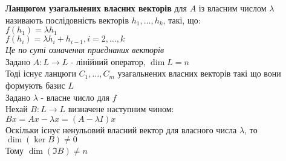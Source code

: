 \documentclass[a4paper, 10pt]{article}
\theoremstyle{theoremdd}
\begin{document}
\textbf{Ланцюгом узагальнених власних векторів} для $A$ із власним числом $\lambda$ називають послідовність векторів $h_1, \dots, h_k$, такі, що:\\
$f(h_1) = \lambda h_1$\\
$f(h_i) = \lambda h_i + h_{i-1}, i=2,\dots,k$\\
\textit{Це по суті означення приєднаних векторів}
\bigskip \\
\lm{} Задано $A: L \to L$ - лінійний оператор, $\dim L = n$\\
Тоді існує ланцюги $C_1,\dots,C_m$ узагальнених власних векторів такі що вони формують базис $L$\\
\proofMI
Задано $\lambda$ - власне число для $f$\\
Нехай $B: L \to L$ визначене наступним чином:\\
$Bx = Ax - \lambda x = (A - \lambda I)x$\\
Оскільки існує ненульовий власний вектор для власного числа $\lambda$, то $\dim (\ker B) \neq 0$\\
Тому $\dim (\Im B) \neq n$\\
\newpage
\end{document}
